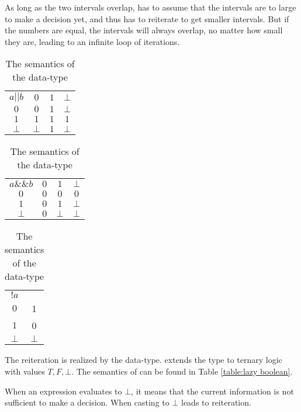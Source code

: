	  As long as the two intervals overlap, \irram has to assume that the
    intervals are to large to make a decision yet, and thus has to reiterate to
    get smaller intervals.
    But if the numbers are equal, the intervals will always overlap, 
		no matter how small they are, leading to an infinite loop of iterations.
    \begin{table}
       \centering
       \begin{tabular}{|c||c|c|c|}
        \hline
        $ a || b$ & $0$ & $1$ & $\bot$ \\ \hhline{|=||=|=|=|} 
        $ 0 $     & $0$ & $1$ & $\bot$ \\ \hline
        $ 1$      & $1$ & $1$ & $1$ \\ \hline
        $\bot$ & $\bot$  & $1$ & $\bot$ \\ \hline
       \end{tabular}
       \quad
       \begin{tabular}{|c||c|c|c|}
        \hline
        $ a \&\& b$ & $0$ & $1$ & $\bot$ \\ \hhline{|=||=|=|=|} 
        $ 0 $     & $0$ & $0$ & $0$ \\ \hline
        $ 1$      & $0$ & $1$ & $\bot$ \\ \hline
        $\bot$ & $0$  & $\bot$ & $\bot$ \\ \hline
       \end{tabular}
       \quad
       \begin{tabular}{|c||c|}
        \hline
        $ !a $ &   \\ \hhline{|=||=|} 
        $ 0 $ &  1 \\ \hline
        $ 1$ &  0 \\ \hline
        $\bot$ & $\bot$  \\ \hline
       \end{tabular}
    \caption{The semantics of the  data-type}\label{table:lazy
  boolean}
    \end{table}
    The reiteration is realized by the  data-type.
     extends the  type to  ternary logic
		with values $T, F,\bot$. The semantics of  can be found
    in Table \ref{table:lazy boolean}.
    
    When an expression evaluates to $\bot$, it means that the current information is not sufficient to make a decision.
		When casting to  $\bot$ leads to reiteration. 

